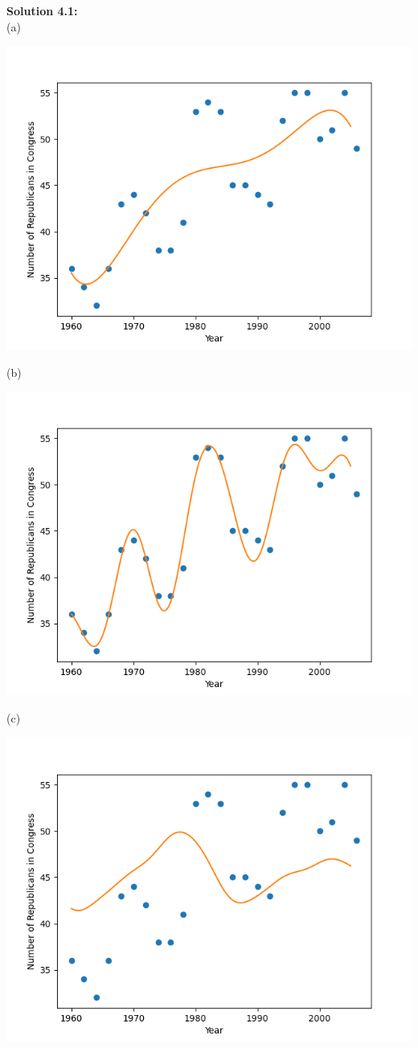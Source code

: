 \documentclass[submit]{harvardml}
\begin{document}
\noindent\textbf{Solution 4.1:}\\
(a)
\begin{center}
    \includegraphics[scale=0.5]{4.1a.png}
\end{center}
(b)
\begin{center}
    \includegraphics[scale=0.5]{4.1b.png}
\end{center}
(c)
\begin{center}
    \includegraphics[scale=0.5]{4.1c.png}
\end{center}
\end{document}
